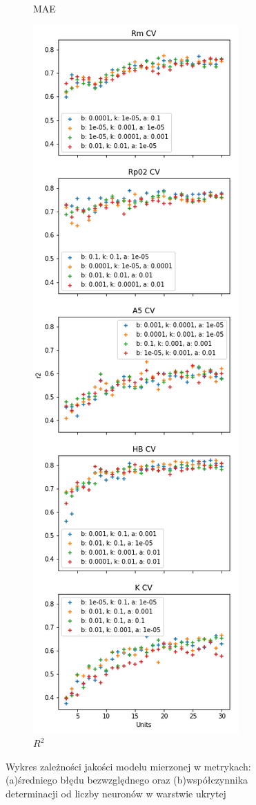 \begin{figure}
\begin{subfigure}[b]{0.37\textwidth}
         \caption{MAE}
         \label{fig:perf-avg-mae}
     \end{subfigure}
     \hfill
     \begin{subfigure}[b]{0.37\textwidth}
         \centering
         \includegraphics[width=\textwidth]{images/perf_avg_r2.png}
         \caption{$R^{2}$}
         \label{fig:peft-avg-r2}
     \end{subfigure}
        \caption{Wykres zależności jakości modelu mierzonej w metrykach: (a)średniego błędu bezwzględnego oraz (b)współczynnika determinacji od liczby neuronów w warstwie ukrytej}
        \label{fig:perf-avg}
\end{figure}

